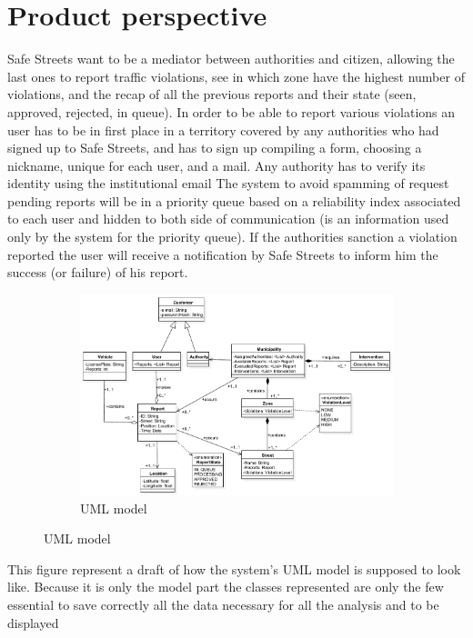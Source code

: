 \documentclass[12pt,a4paper]{report}
\begin{document}
	\section{Product perspective}
		Safe Streets want to be a mediator between authorities and citizen, allowing the last ones to report traffic violations, see
		in which zone have the highest number of violations, and the recap of all the previous reports and their state
		(seen, approved, rejected, in queue). In order to be able to report various violations an user has to be in first place in a
		territory covered by any authorities who had signed up to Safe Streets, and has to sign up compiling a form, choosing a
		nickname, unique for each user, and a mail. Any authority has to verify its identity using the institutional email 
		The system to avoid spamming of request pending reports will be in a priority queue based 
		on a reliability index associated to each user and hidden to both side of communication (is an information used only by 
		the system for the priority queue). If the authorities sanction a violation reported the user 
		will receive a notification by Safe Streets to inform him the success (or failure) of his report. 
		\begin{figure}[H]
			\begin{subfigure}{\textwidth}
				\includegraphics[scale = 0.75, center]{uml}
				\caption{UML model}
				\label{UML model }
			\end{subfigure}
		\end{figure}
		This figure represent a draft of how the system's UML model is supposed to look like. Because it is only the model part the 
		classes represented are only the few essential to save correctly all the data necessary for all the analysis and to be displayed
\end{document}

